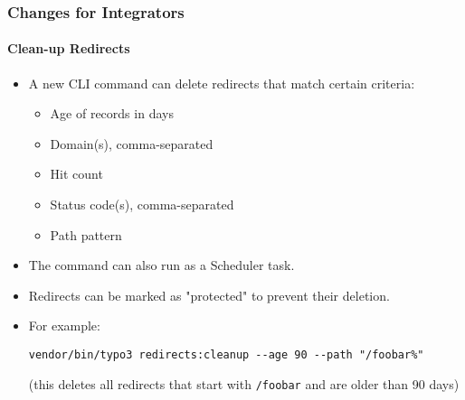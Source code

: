 %

\begin{frame}[fragile]
	\frametitle{Changes for Integrators}
	\framesubtitle{Clean-up Redirects}


	\begin{itemize}
		\item A new CLI command can delete redirects that match certain criteria:
			\begin{itemize}
				\item Age of records in days
				\item Domain(s), comma-separated
				\item Hit count
				\item Status code(s), comma-separated
				\item Path pattern
			\end{itemize}
		\item The command can also run as a Scheduler task.
		\item Redirects can be marked as "protected" to prevent their deletion.
		\item For example:
\begin{lstlisting}
vendor/bin/typo3 redirects:cleanup --age 90 --path "/foobar%"
\end{lstlisting}

			\smaller
				(this deletes all redirects that start with \texttt{/foobar} and are older than 90 days)
			\normalsize

	\end{itemize}
\end{frame}

